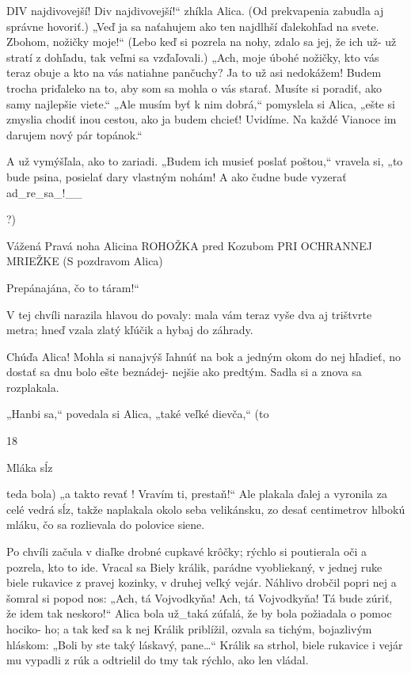 \documentclass[12pt]{article}
\begin{document}
\begin{Parallel}[p]{}{}
{DIV najdivovejší! Div najdivovejší!“ zhíkla Alica.
(Od prekvapenia zabudla aj správne hovoriť.)
„Veď ja sa naťahujem ako ten najdlhší ďalekohľad na svete.
Zbohom, nožičky moje!“ (Lebo keď si pozrela na nohy,
zdalo sa jej, že ich už- už stratí z dohľadu, tak veľmi sa
vzďaľovali.) „Ach, moje úbohé nožičky, kto vás teraz obuje
a kto na vás natiahne pančuchy? Ja to už asi nedokážem!
Budem trocha priďaleko na to, aby som sa mohla o vás
starať. Musíte si poradiť, ako samy najlepšie viete.“ „Ale
musím byť k nim dobrá,“ pomyslela si Alica, „ešte si zmyslia
chodiť inou cestou, ako ja budem chcieť! Uvidíme. Na každé
Vianoce im darujem nový pár topánok.“

A už vymýšľala, ako to zariadi. „Budem ich musieť poslať
poštou,“ vravela si, „to bude psina, posielať dary vlastným
nohám! A ako čudne bude vyzerať ad_re_sa_!__

?)

Vážená
Pravá noha Alicina
ROHOŽKA pred Kozubom
PRI OCHRANNEJ MRIEŽKE
(S pozdravom Alica)

Prepánajána, čo to táram!“

V tej chvíli narazila hlavou do povaly: mala vám teraz vyše
dva aj trištvrte metra; hneď vzala zlatý kľúčik a hybaj do
záhrady.

Chúďa Alica! Mohla si nanajvýš ľahnúť na bok a jedným
okom do nej hľadieť, no dostať sa dnu bolo ešte beznádej-
nejšie ako predtým. Sadla si a znova sa rozplakala.

„Hanbi sa,“ povedala si Alica, „také veľké dievča,“ (to

18

Mláka sĺz

teda bola) „a takto revať ! Vravím ti, prestaň!“ Ale plakala
ďalej a vyronila za celé vedrá sĺz, takže naplakala okolo seba
velikánsku, zo desať centimetrov hlbokú mláku, čo sa
rozlievala do polovice siene.

Po chvíli začula v diaľke drobné cupkavé krôčky; rýchlo si
poutierala oči a pozrela, kto to ide. Vracal sa Biely králik,
parádne vyobliekaný, v jednej ruke biele rukavice z pravej
kozinky, v druhej veľký vejár. Náhlivo drobčil popri nej
a šomral si popod nos: „Ach, tá Vojvodkyňa! Ach, tá
Vojvodkyňa! Tá bude zúriť, že idem tak neskoro!“ Alica
bola už_taká zúfalá, že by bola požiadala o pomoc hociko-
ho; a tak keď sa k nej Králik priblížil, ozvala sa tichým,
bojazlivým hláskom: „Boli by ste taký láskavý, pane…“
Králik sa strhol, biele rukavice i vejár mu vypadli z rúk
a odtrielil do tmy tak rýchlo, ako len vládal.

}
\end{Parallel}
\end{document}
